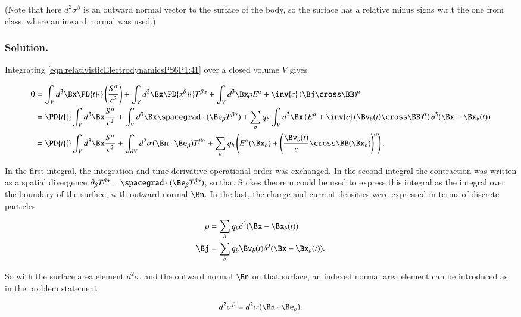 (Note that here $d^2 \sigma^\beta$ is an outward normal vector to the surface of the body, so the surface has a relative minus signs w.r.t the one from class, where an inward normal was used.)

\subsubsection{Solution.}

Integrating \ref{eqn:relativisticElectrodynamicsPS6P1:41} over a closed volume $V$ gives

\begin{align*}
0 
&=
\int_V d^3 \Bx \PD{t}{}\left( \frac{S^\alpha}{c^2} \right) 
+ 
\int_V d^3 \Bx \PD{x^\beta}{} T^{\beta \alpha} 
+
\int_V d^3 \Bx \rho E^\alpha + \inv{c} \left( \Bj \cross \BB \right)^\alpha  \\
&=
\PD{t}{} \int_V d^3 \Bx \frac{S^\alpha}{c^2} 
+ 
\int_V d^3 \Bx \spacegrad \cdot (\Be_\beta T^{\beta \alpha})
+
\sum_b q_b \int_V d^3 \Bx \left( E^\alpha + \inv{c} \left( \Bv_b(t) \cross \BB \right)^\alpha \right) \delta^3(\Bx - \Bx_b(t)) \\
&=
\PD{t}{} \int_V d^3 \Bx \frac{S^\alpha}{c^2} 
+ 
\int_{\partial V} d^2 \sigma (\Bn \cdot \Be_\beta) T^{\beta \alpha}
+
\sum_b q_b \left( E^\alpha(\Bx_b) + \left( \frac{\Bv_b(t)}{c} \cross \BB(\Bx_b) \right)^\alpha \right).
\end{align*}

In the first integral, the integration and time derivative operational order was exchanged.  In the second integral the contraction was written as a spatial divergence $\partial_\beta T^{\beta \alpha} = \spacegrad \cdot (\Be_\beta T^{\beta \alpha})$, so that Stokes theorem could be used to express this integral as the integral over the boundary of the surface, with outward normal $\Bn$.  In the last, the charge and current densities were expressed in terms of discrete particles

\begin{align}\label{eqn:relativisticElectrodynamicsPS6P1:230}
\rho &= \sum_b q_b \delta^3(\Bx - \Bx_b(t)) \\
\Bj &= \sum_b q_b \Bv_b(t) \delta^3(\Bx - \Bx_b(t)).
\end{align}

So with the surface area element $d^2 \sigma$, and the outward normal $\Bn$ on that surface, an indexed normal area element can be introduced as in the problem statement

\begin{equation}\label{eqn:relativisticElectrodynamicsPS6P1:250}
d^2 \sigma^\beta \equiv d^2 \sigma (\Bn \cdot \Be_\beta).
\end{equation}

